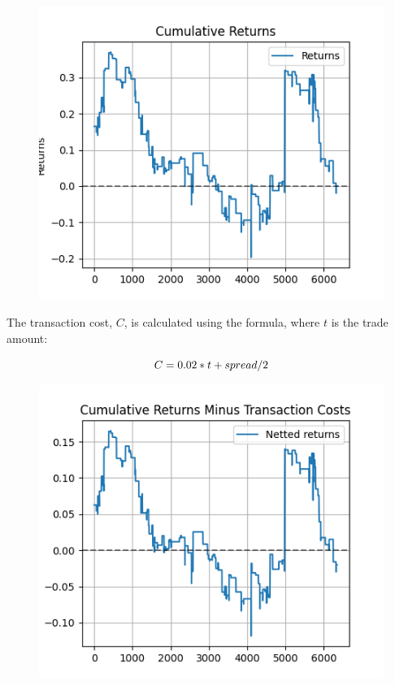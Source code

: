 \documentclass[a4paper]{article}
\begin{document}
\begin{figure}[H]
    \begin{center}
        \includegraphics{../generated/cumulative_returns.png}
    \end{center}
\end{figure}

The transaction cost, $C$, is calculated using the formula, where $t$ is the trade amount:

\begin{equation}
\label{eq:NPV_L}
C = 0.02 * t + spread/2
\end{equation}


\begin{figure}[H]
    \begin{center}
        \includegraphics{../generated/cumulative_returns_except_trans_costs.png}
    \end{center}
\end{figure}


\end{document}

